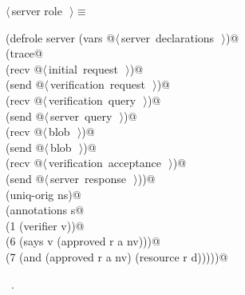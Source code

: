 \documentclass[titlepage,12pt]{article}
\theoremstyle{definition}
\begin{document}
\begin{flushleft} \small
\begin{minipage}{\linewidth} \label{scrap17}
$\langle\,$server role\nobreak\ {\footnotesize {}}$\,\rangle\equiv$
\vspace{-1ex}
\begin{list}{}{} \item
\mbox{}\verb@(defrole server (vars @\hbox{$\langle\,$server declarations\nobreak\ {\footnotesize {}}$\,\rangle$}\verb@)@\\
\mbox{}\verb@  (trace@\\
\mbox{}\verb@    (recv @\hbox{$\langle\,$initial request\nobreak\ {\footnotesize {}}$\,\rangle$}\verb@)@\\
\mbox{}\verb@    (send @\hbox{$\langle\,$verification request\nobreak\ {\footnotesize {}}$\,\rangle$}\verb@)@\\
\mbox{}\verb@    (recv @\hbox{$\langle\,$verification query\nobreak\ {\footnotesize {}}$\,\rangle$}\verb@)@\\
\mbox{}\verb@    (send @\hbox{$\langle\,$server query\nobreak\ {\footnotesize {}}$\,\rangle$}\verb@)@\\
\mbox{}\verb@    (recv @\hbox{$\langle\,$blob\nobreak\ {\footnotesize {}}$\,\rangle$}\verb@)@\\
\mbox{}\verb@    (send @\hbox{$\langle\,$blob\nobreak\ {\footnotesize {}}$\,\rangle$}\verb@)@\\
\mbox{}\verb@    (recv @\hbox{$\langle\,$verification acceptance\nobreak\ {\footnotesize {}}$\,\rangle$}\verb@)@\\
\mbox{}\verb@    (send @\hbox{$\langle\,$server response\nobreak\ {\footnotesize {}}$\,\rangle$}\verb@))@\\
\mbox{}\verb@    (uniq-orig ns)@\\
\mbox{}\verb@    (annotations s@\\
\mbox{}\verb@      (1 (verifier v))@\\
\mbox{}\verb@      (6 (says v (approved r a nv)))@\\
\mbox{}\verb@      (7 (and (approved r a nv) (resource r d)))))@{\NWsep}
\end{list}
\vspace{-1ex}
\footnotesize\addtolength{\baselineskip}{-1ex}
\begin{list}{}{\setlength{\itemsep}{-\parsep}\setlength{\itemindent}{-\leftmargin}}
\item \NWtxtMacroRefIn\ .
\end{list}
\end{minipage}\\[4ex]
\end{flushleft}
\end{document}

